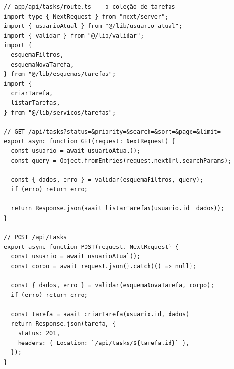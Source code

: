 \begin{codigo}
\begin{Verbatim}[breaklines=true, breaksymbolleft={}, fontsize=\footnotesize]
// app/api/tasks/route.ts -- a coleção de tarefas
import type { NextRequest } from "next/server";
import { usuarioAtual } from "@/lib/usuario-atual";
import { validar } from "@/lib/validar";
import {
  esquemaFiltros,
  esquemaNovaTarefa,
} from "@/lib/esquemas/tarefas";
import {
  criarTarefa,
  listarTarefas,
} from "@/lib/servicos/tarefas";

// GET /api/tasks?status=&priority=&search=&sort=&page=&limit=
export async function GET(request: NextRequest) {
  const usuario = await usuarioAtual();
  const query = Object.fromEntries(request.nextUrl.searchParams);

  const { dados, erro } = validar(esquemaFiltros, query);
  if (erro) return erro;

  return Response.json(await listarTarefas(usuario.id, dados));
}

// POST /api/tasks
export async function POST(request: NextRequest) {
  const usuario = await usuarioAtual();
  const corpo = await request.json().catch(() => null);

  const { dados, erro } = validar(esquemaNovaTarefa, corpo);
  if (erro) return erro;

  const tarefa = await criarTarefa(usuario.id, dados);
  return Response.json(tarefa, {
    status: 201,
    headers: { Location: `/api/tasks/${tarefa.id}` },
  });
}
\end{Verbatim}
\end{codigo}

